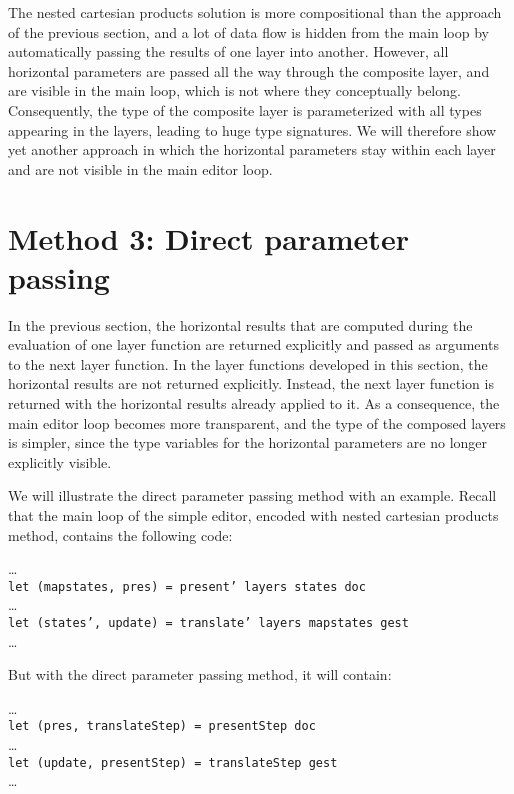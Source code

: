 The nested cartesian products solution is more compositional than the approach of the previous section, and a lot of data flow is hidden from the main loop by automatically passing the results of one layer into another. However, all horizontal parameters are passed all the way through the composite layer, and are visible in the main loop, which is not where they conceptually belong. Consequently, the type of the composite layer is parameterized with all types appearing in the layers, leading to huge type signatures. We will therefore show yet another approach in which the horizontal parameters stay within each layer and are not visible in the main editor loop.


%																
%																
%																
\section{Method 3: Direct parameter passing} \label{sectdpp}
 
In the previous section, the horizontal results that are computed during the evaluation of one layer function are returned explicitly and passed as arguments to the next layer function. In the layer functions developed in this section, the horizontal results are not returned explicitly.  Instead, the next layer function is returned with the horizontal results already applied to it. As a consequence, the main editor loop becomes more transparent, and the type of the composed layers is simpler, since the type variables for the horizontal parameters are no longer explicitly visible.

We will illustrate the direct parameter passing method with an example. Recall that the main loop of the simple editor, encoded with nested cartesian products method, contains the following code:

\dots\\
{\tt let (mapstates, pres) = present' layers states doc}\\
\dots\\
{\tt let (states', update) = translate' layers mapstates gest}\\
\dots

But with the direct parameter passing method, it will contain:

\dots\\
{\tt let (pres, translateStep) = presentStep doc}\\
\dots\\
{\tt let (update, presentStep) = translateStep gest}\\
\dots

